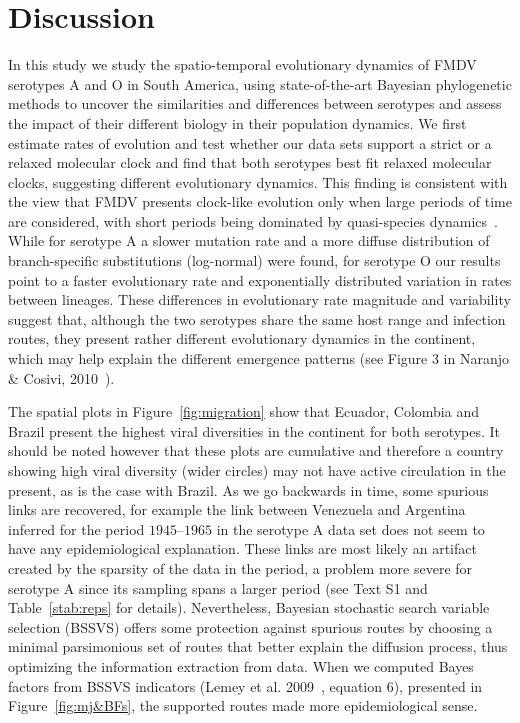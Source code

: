 \documentclass[10pt]{article}
\begin{document}
\section*{Discussion}
% 
In this study we study the  spatio-temporal evolutionary dynamics of FMDV serotypes A and O in South America, using state-of-the-art Bayesian phylogenetic methods to uncover the similarities and differences between serotypes and assess the impact of their different biology in their population dynamics.
We first estimate rates of evolution and test whether our data sets support a strict or a relaxed molecular clock and find that both serotypes best fit relaxed molecular clocks, suggesting different evolutionary dynamics.
This finding is consistent with the view that FMDV presents clock-like evolution only when large periods of time are considered, with short periods being dominated by quasi-species dynamics~\cite{Muellner2011}.  
While for serotype A a slower mutation rate and a more diffuse distribution of branch-specific substitutions (log-normal) were found, for serotype O our results point to a faster evolutionary rate and exponentially distributed variation in rates between lineages.
These differences in evolutionary rate magnitude and variability suggest that, although the two serotypes share the same host range and infection routes, they present rather different evolutionary dynamics in the continent, which may help explain the different emergence patterns (see Figure 3 in Naranjo \& Cosivi, 2010~\cite{Naranjo2013}). 

The spatial plots in Figure~\ref{fig:migration} show that Ecuador, Colombia and Brazil present the highest viral diversities in the continent for both serotypes.
It should be noted however that these plots are cumulative and therefore a country showing high viral diversity (wider circles) may not have active circulation in the present, as is the case with Brazil.
As we go backwards in time, some spurious links are recovered, for example the link between Venezuela and Argentina inferred for the period $1945$--$1965$ in the serotype A data set does not seem to have any epidemiological explanation.
These links are most likely an artifact created by the sparsity of the data in the period, a problem more severe for serotype A since its sampling spans a larger period (see Text S1 and Table~\ref{stab:reps} for details).
Nevertheless, Bayesian stochastic search variable selection (BSSVS) offers some protection against spurious routes by choosing a minimal parsimonious set of routes that better explain the diffusion process, thus optimizing the information extraction from data. 
When we computed Bayes factors from BSSVS indicators (Lemey et al. 2009~\cite{roots}, equation 6), presented in Figure~\ref{fig:mj&BFs}, the supported routes made more epidemiological sense.
%
\end{document}
